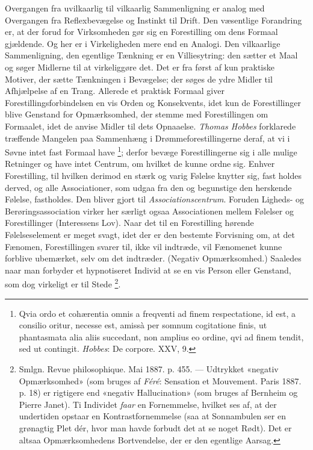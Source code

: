 \documentclass[12pt,a4paper,openany]{book}
\newcommand{\opage}[1]{\marginnote{\footnotesize\textit{[#1]}}}
\begin{document}
Overgangen fra uvilkaarlig til vilkaarlig Sammenligning er analog med
Overgangen fra Reflexbevægelse og Instinkt til Drift. Den væsentlige Forandring
er, at der forud for Virksomheden gør sig en Forestilling om dens Formaal
gjældende. Og her er i Virkeligheden mere end en Analogi. Den vilkaarlige
Sammenligning, den egentlige Tænkning er en Villiesytring: den sætter et Maal
og søger Midlerne til at virkeliggøre det. Det er fra først af kun praktiske
Motiver, der sætte Tænkningen i Bevægelse; der søges de ydre Midler til
Afhjælpelse af en Trang. Allerede et praktisk Formaal giver
Forestillingsforbindelsen en vis Orden og Konsekvents, idet kun de
Forestillinger blive Genstand for Opmærksomhed, der stemme med Forestillingen
om Formaalet, idet de anvise Midler til dets Opnaaelse. \emph{Thomas Hobbes}
forklarede træffende Mangelen paa Sammenhæng i Drømmeforestillingerne deraf, at
vi i Søvne intet fast Formaal have%
\footnote[2]{Qvia ordo et cohærentia omnis a freqventi ad finem respectatione,
id est, a consilio oritur, necesse est, amissà per somnum cogitatione finis, ut
phantasmata alia aliis succedant, non amplius eo ordine, qvi ad finem tendit,
sed ut contingit. \emph{Hobbes}: De corpore. XXV, 9.}; derfor bevæge
Forestillingerne sig i alle mulige Retninger og have intet Centrum, om hvilket
de kunne ordne sig. Enhver Forestilling, til hvilken derimod en stærk og varig
Følelse knytter sig, fast%
\setcounter{footnote}{0}%
\opage{65}holdes derved, og alle Associationer, som udgaa fra den og begunstige
den herskende Følelse, fastholdes. Den bliver gjort til
\emph{Associationscentrum}. Foruden Ligheds- og Berøringsassociation virker her
særligt ogsaa Associationen mellem Følelser og Forestillinger (Interessens
Lov). Naar det til en Forestilling hørende Følelseselement er meget svagt, idet
der er den bestemte Forvisning om, at det Fænomen, Forestillingen svarer til,
ikke vil indtræde, vil Fænomenet kunne forblive ubemærket, selv om det
indtræder. (Negativ Opmærksomhed.) Saaledes naar man forbyder et hypnotiseret
Individ at se en vis Person eller Genstand, som dog virkeligt er til Stede%
\footnote[1]{Smlgn. Revue philosophique. Mai 1887. p. 455. --- Udtrykket
«negativ Opmærksomhed» (som bruges af \emph{Féré}: Sensation et Mouvement.
Paris 1887. p. 18) er rigtigere end «negativ Hallucination» (som bruges af
Bernheim og Pierre Janet). Ti Individet \emph{faar} en Fornemmelse, hvilket ses
af, at der undertiden opstaar en Kontrastfornemmelse (saa at Sonnambulen ser en
grønagtig Plet dér, hvor man havde forbudt det at se noget Rødt). Det er altsaa
Opmærksomhedens Bortvendelse, der er den egentlige Aarsag.}.
\end{document}
